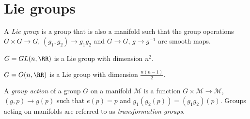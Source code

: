 \documentclass{jknotes}
\begin{document}
\section{Lie groups}
\begin{defn}
    A \emph{Lie group} is a group that is also a manifold such that the group operations \(G\times G\to G\), \((g_1,g_2)\to g_1g_2\) and \(G\to G\), \(g\to g^{-1}\) are smooth maps.
\end{defn}
\begin{eg}
    \(G=GL(n,\RR)\) is a Lie group with dimension \(n^2\).
\end{eg}
\begin{eg}
    \(G=O(n,\RR)\) is a Lie group with dimension \(\frac{n(n-1)}{2}\).
\end{eg}
\begin{defn}
    A \emph{group action} of a group \(G\) on a manifold \(\mathcal{M}\) is a function \(G\times\mathcal{M}\to\mathcal{M}\), \((g,p)\to g(p)\) such that \(e(p) = p\) and \(g_1(g_2(p)) = (g_1g_2)(p)\). Groups acting on manifolds are referred to as \emph{transformation groups}.
\end{defn}
\end{document}
